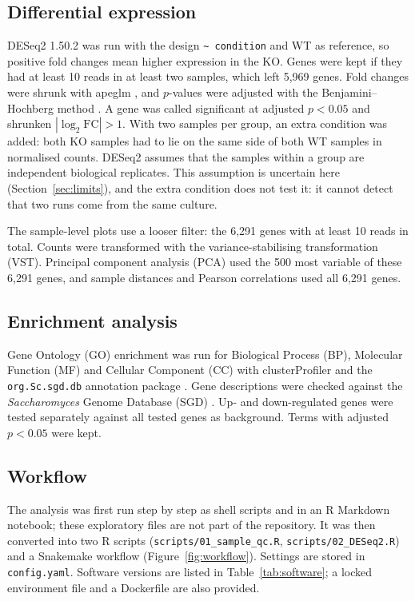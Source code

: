 \documentclass[11pt, a4paper]{article}
\begin{document}
\subsection{Differential expression}
DESeq2 1.50.2 \cite{love2014} was run with the design \texttt{\textasciitilde\,condition} and WT as reference, so positive fold changes mean higher expression in the KO. Genes were kept if they had at least 10 reads in at least two samples, which left 5,969 genes. Fold changes were shrunk with apeglm \cite{zhu2019}, and $p$-values were adjusted with the Benjamini--Hochberg method \cite{benjamini1995}. A gene was called significant at adjusted $p<0.05$ and shrunken $|\log_2\mathrm{FC}|>1$. With two samples per group, an extra condition was added: both KO samples had to lie on the same side of both WT samples in normalised counts. DESeq2 assumes that the samples within a group are independent biological replicates. This assumption is uncertain here (Section~\ref{sec:limits}), and the extra condition does not test it: it cannot detect that two runs come from the same culture.

The sample-level plots use a looser filter: the 6,291 genes with at least 10 reads in total. Counts were transformed with the variance-stabilising transformation (VST). Principal component analysis (PCA) used the 500 most variable of these 6,291 genes, and sample distances and Pearson correlations used all 6,291 genes.

\subsection{Enrichment analysis}
Gene Ontology (GO) \cite{ashburner2000} enrichment was run for Biological Process (BP), Molecular Function (MF) and Cellular Component (CC) with clusterProfiler \cite{wu2021} and the \texttt{org.Sc.sgd.db} annotation package \cite{carlson2025}. Gene descriptions were checked against the \textit{Saccharomyces} Genome Database (SGD) \cite{cherry2012}. Up- and down-regulated genes were tested separately against all tested genes as background. Terms with adjusted $p<0.05$ were kept.

\subsection{Workflow}
The analysis was first run step by step as shell scripts and in an R Markdown notebook; these exploratory files are not part of the repository. It was then converted into two R scripts (\texttt{scripts/01\_sample\_qc.R}, \texttt{scripts/02\_DESeq2.R}) and a Snakemake workflow \cite{snakemake2021} (Figure~\ref{fig:workflow}). Settings are stored in \texttt{config.yaml}. Software versions are listed in Table~\ref{tab:software}; a locked environment file and a Dockerfile are also provided.
\end{document}
